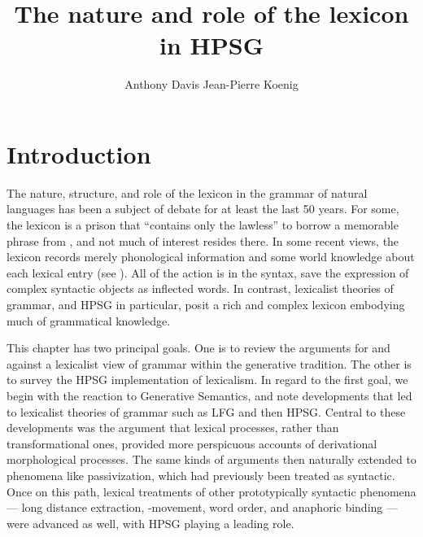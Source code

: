 \documentclass[output=paper]{langsci/langscibook}
\author{%
Anthony Davis\affiliation{Buffalo?}%
\lastand Jean-Pierre Koenig\affiliation{University at Buffalo}%
}
\title{The nature and role of the lexicon in HPSG}
\begin{document}

\section{Introduction}

The nature, structure, and role of the lexicon in the grammar of natural languages has been a subject of debate for at least the last 50 years. For some, the lexicon is a prison that ``contains only the lawless''  to borrow a memorable phrase from , and not much of interest resides there. In some recent views, the lexicon records merely phonological information and some world knowledge about each lexical entry (see \citet{Marantz1997}). All of the action is in the syntax, save the expression of complex syntactic objects as inflected words.
In contrast, lexicalist theories of grammar, and HPSG in particular, posit a rich and complex lexicon embodying much of grammatical knowledge.

This chapter has two principal goals.  One is to review the arguments for and against a lexicalist view of grammar within the generative tradition.  The other is to survey the HPSG implementation of lexicalism. In regard to the first goal, we begin with the reaction to Generative Semantics, and note developments that led to lexicalist theories of grammar such as LFG and then HPSG.  Central to these developments was the argument that lexical processes, rather than transformational ones, provided more perspicuous accounts of derivational morphological processes.  The same kinds of arguments then naturally extended to phenomena like passivization, which had previously been treated as syntactic.  Once on this path, lexical treatments of other prototypically syntactic phenomena — long distance extraction, -movement, word order, and anaphoric binding — were advanced as well, with HPSG playing a leading role.
\end{document}
